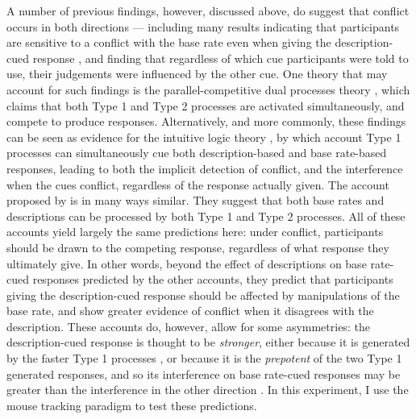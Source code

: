 A number of previous findings, however, discussed above,
do suggest that conflict occurs in both directions ---
including many results indicating that participants
are sensitive to a conflict with the base rate
even when giving the description-cued response
\citep{DeNeys2008,DeNeys2008a,Pennycook2012a},
and  finding
that regardless of which cue participants were told to use,
their judgements were influenced by the other cue.
One theory that may account for such findings
is the parallel-competitive dual processes theory \citep[i.e.][]{Sloman1996,Sloman2014},
which claims that both Type 1 and Type 2 processes
are activated simultaneously, and compete to produce responses.
Alternatively, and more commonly, these findings
can be seen as evidence for the intuitive logic theory \citep{DeNeys2012},
by which account Type 1 processes can simultaneously cue
both description-based and base rate-based responses,
leading to both the implicit detection of conflict,
and the interference when the cues conflict,
regardless of the response actually given.
The account proposed by \citet{Handley2015} is in many ways similar.
They suggest that both base rates and descriptions
can be processed by both Type 1 and Type 2 processes.
All of these accounts yield largely the same predictions here:
under conflict, participants should be drawn to the competing response,
regardless of what response they ultimately give.
In other words, beyond the effect of
descriptions on base rate-cued responses predicted by the other accounts,
they predict that participants giving the description-cued response
should be affected by manipulations of the base rate,
and show greater evidence of conflict when it disagrees with the description.
These accounts do, however, allow for some asymmetries:
the description-cued response is thought to be \emph{stronger},
either because it is generated by the faster Type 1 processes \citep{Kahneman2005,Kahneman2002},
or because it is the \emph{prepotent} of the two Type 1 generated responses,
and so its interference on base rate-cued responses
may be greater than the interference in the other direction \citep[see][]{DeNeys2012}.
In this experiment, I use the mouse tracking paradigm to test these predictions.



